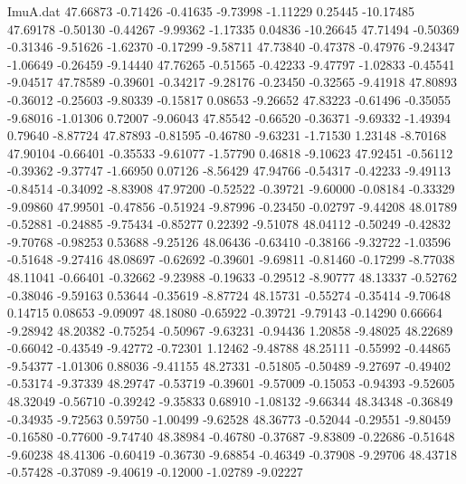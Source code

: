 \begin{filecontents}{ImuA.dat}
  47.66873   -0.71426   -0.41635   -9.73998   -1.11229    0.25445  -10.17485
  47.69178   -0.50130   -0.44267   -9.99362   -1.17335    0.04836  -10.26645
  47.71494   -0.50369   -0.31346   -9.51626   -1.62370   -0.17299   -9.58711
  47.73840   -0.47378   -0.47976   -9.24347   -1.06649   -0.26459   -9.14440
  47.76265   -0.51565   -0.42233   -9.47797   -1.02833   -0.45541   -9.04517
  47.78589   -0.39601   -0.34217   -9.28176   -0.23450   -0.32565   -9.41918
  47.80893   -0.36012   -0.25603   -9.80339   -0.15817    0.08653   -9.26652
  47.83223   -0.61496   -0.35055   -9.68016   -1.01306    0.72007   -9.06043
  47.85542   -0.66520   -0.36371   -9.69332   -1.49394    0.79640   -8.87724
  47.87893   -0.81595   -0.46780   -9.63231   -1.71530    1.23148   -8.70168
  47.90104   -0.66401   -0.35533   -9.61077   -1.57790    0.46818   -9.10623
  47.92451   -0.56112   -0.39362   -9.37747   -1.66950    0.07126   -8.56429
  47.94766   -0.54317   -0.42233   -9.49113   -0.84514   -0.34092   -8.83908
  47.97200   -0.52522   -0.39721   -9.60000   -0.08184   -0.33329   -9.09860
  47.99501   -0.47856   -0.51924   -9.87996   -0.23450   -0.02797   -9.44208
  48.01789   -0.52881   -0.24885   -9.75434   -0.85277    0.22392   -9.51078
  48.04112   -0.50249   -0.42832   -9.70768   -0.98253    0.53688   -9.25126
  48.06436   -0.63410   -0.38166   -9.32722   -1.03596   -0.51648   -9.27416
  48.08697   -0.62692   -0.39601   -9.69811   -0.81460   -0.17299   -8.77038
  48.11041   -0.66401   -0.32662   -9.23988   -0.19633   -0.29512   -8.90777
  48.13337   -0.52762   -0.38046   -9.59163    0.53644   -0.35619   -8.87724
  48.15731   -0.55274   -0.35414   -9.70648    0.14715    0.08653   -9.09097
  48.18080   -0.65922   -0.39721   -9.79143   -0.14290    0.66664   -9.28942
  48.20382   -0.75254   -0.50967   -9.63231   -0.94436    1.20858   -9.48025
  48.22689   -0.66042   -0.43549   -9.42772   -0.72301    1.12462   -9.48788
  48.25111   -0.55992   -0.44865   -9.54377   -1.01306    0.88036   -9.41155
  48.27331   -0.51805   -0.50489   -9.27697   -0.49402   -0.53174   -9.37339
  48.29747   -0.53719   -0.39601   -9.57009   -0.15053   -0.94393   -9.52605
  48.32049   -0.56710   -0.39242   -9.35833    0.68910   -1.08132   -9.66344
  48.34348   -0.36849   -0.34935   -9.72563    0.59750   -1.00499   -9.62528
  48.36773   -0.52044   -0.29551   -9.80459   -0.16580   -0.77600   -9.74740
  48.38984   -0.46780   -0.37687   -9.83809   -0.22686   -0.51648   -9.60238
  48.41306   -0.60419   -0.36730   -9.68854   -0.46349   -0.37908   -9.29706
  48.43718   -0.57428   -0.37089   -9.40619   -0.12000   -1.02789   -9.02227

\end{filecontents}
